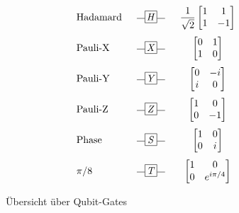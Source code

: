 \begin{figure}[ht!]
\centering
\[
\begin{array}{l @{\hspace{1.5em}} c @{\hspace{1.5em}} c}
\text{Hadamard} 
& \rule[0.4ex]{0.8em}{0.4pt}\tikz[baseline=(X.base)] \node[draw, minimum size=1.2em, inner sep=0pt] (X) {\textit{H}}; \rule[0.4ex]{0.8em}{0.4pt}
& \dfrac{1}{\sqrt{2}} \begin{bmatrix} 1 & 1 \\ 1 & -1 \end{bmatrix} \\[3ex]
\text{Pauli-X}  
& \rule[0.4ex]{0.8em}{0.4pt}\tikz[baseline=(X.base)] \node[draw, minimum size=1.2em, inner sep=0pt] (X) {\textit{X}}; \rule[0.4ex]{0.8em}{0.4pt}
& \begin{bmatrix} 0 & 1 \\ 1 & 0 \end{bmatrix} \\[3ex]
\text{Pauli-Y}  
& \rule[0.4ex]{0.8em}{0.4pt}\tikz[baseline=(X.base)] \node[draw, minimum size=1.2em, inner sep=0pt] (X) {\textit{Y}}; \rule[0.4ex]{0.8em}{0.4pt}
& \begin{bmatrix} 0 & -i \\ i & 0 \end{bmatrix} \\[3ex]
\text{Pauli-Z}  
& \rule[0.4ex]{0.8em}{0.4pt}\tikz[baseline=(X.base)] \node[draw, minimum size=1.2em, inner sep=0pt] (X) {\textit{Z}}; \rule[0.4ex]{0.8em}{0.4pt}
& \begin{bmatrix} 1 & 0 \\ 0 & -1 \end{bmatrix} \\[3ex]
\text{Phase}    
& \rule[0.4ex]{0.8em}{0.4pt}\tikz[baseline=(X.base)] \node[draw, minimum size=1.2em, inner sep=0pt] (X) {\textit{S}}; \rule[0.4ex]{0.8em}{0.4pt}
& \begin{bmatrix} 1 & 0 \\ 0 & i \end{bmatrix} \\[3ex]
\text{$\pi/8$}         
& \rule[0.4ex]{0.8em}{0.4pt}\tikz[baseline=(X.base)] \node[draw, minimum size=1.2em, inner sep=0pt] (X) {\textit{T}}; \rule[0.4ex]{0.8em}{0.4pt}
& \begin{bmatrix} 1 & 0 \\ 0 & e^{i\pi/4} \end{bmatrix} \\
\end{array}
\]
\caption{Übersicht über Qubit-Gates \autocite[177]{nielsen_quantum_2010}}
\label{fig:qubit-gates}
\end{figure}

